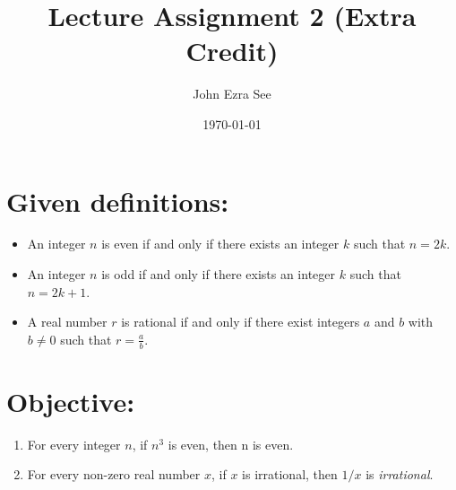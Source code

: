 \documentclass[11pt]{article}
\title{Lecture Assignment 2 (Extra Credit)}
\author{John Ezra See}
\date{\today}
\begin{document}
\maketitle
\section{Given definitions:}
\begin{itemize}
    \item An integer $n$ is even if and only if there exists an integer $k$ such that $n = 2k$.
    \item An integer $n$ is odd if and only if there exists an integer $k$ such that $n = 2k + 1$.
    \item A real number $r$ is rational if and only if there exist integers $a$ and $b$ with $b \neq 0$ such that $r = \frac{a}{b}$.
\end{itemize}

\section{Objective:}
\begin{enumerate}
    \item For every integer $n$, if $n^3$ is even, then n is even.
    \item For every non-zero real number $x$, if $x$ is irrational, then $1/x$ is \textit{irrational}.
\end{enumerate}
\end{document}
